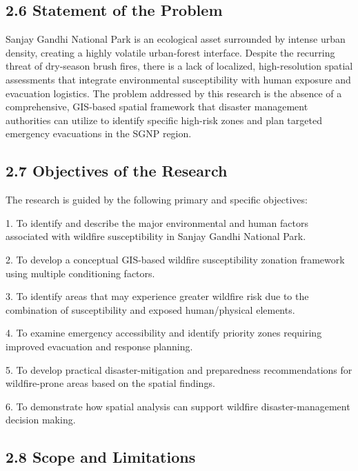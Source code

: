 \documentclass[12pt,a4paper]{article}
\begin{document}
\subsection*{2.6 Statement of the Problem}

Sanjay Gandhi National Park is an ecological asset surrounded by intense urban density, creating a highly volatile urban-forest interface. Despite the recurring threat of dry-season brush fires, there is a lack of localized, high-resolution spatial assessments that integrate environmental susceptibility with human exposure and evacuation logistics. The problem addressed by this research is the absence of a comprehensive, GIS-based spatial framework that disaster management authorities can utilize to identify specific high-risk zones and plan targeted emergency evacuations in the SGNP region.



\subsection*{2.7 Objectives of the Research}

The research is guided by the following primary and specific objectives:


1. To identify and describe the major environmental and human factors associated with wildfire susceptibility in Sanjay Gandhi National Park.


2. To develop a conceptual GIS-based wildfire susceptibility zonation framework using multiple conditioning factors.


3. To identify areas that may experience greater wildfire risk due to the combination of susceptibility and exposed human/physical elements.


4. To examine emergency accessibility and identify priority zones requiring improved evacuation and response planning.


5. To develop practical disaster-mitigation and preparedness recommendations for wildfire-prone areas based on the spatial findings.


6. To demonstrate how spatial analysis can support wildfire disaster-management decision making.



\subsection*{2.8 Scope and Limitations}
\end{document}
